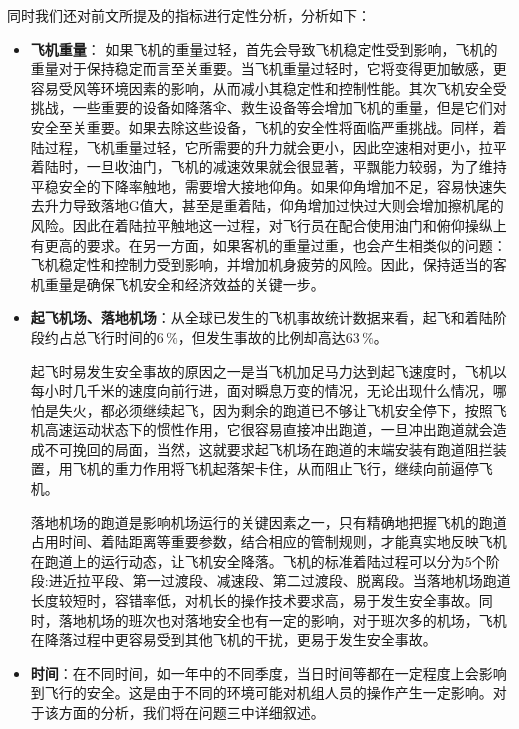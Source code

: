 \documentclass{MathorCupModeling}
\begin{document}
	同时我们还对前文所提及的指标进行定性分析，分析如下：
	\begin{itemize}\label{影响}
		\item \textbf{飞机重量}： 如果飞机的重量过轻，首先会导致飞机稳定性受到影响，飞机的重量对于保持稳定而言至关重要。当飞机重量过轻时，它将变得更加敏感，更容易受风等环境因素的影响，从而减小其稳定性和控制性能。其次飞机安全受挑战，一些重要的设备如降落伞、救生设备等会增加飞机的重量，但是它们对安全至关重要。如果去除这些设备，飞机的安全性将面临严重挑战。同样，着陆过程，飞机重量过轻，它所需要的升力就会更小，因此空速相对更小，拉平着陆时，一旦收油门，飞机的减速效果就会很显著，平飘能力较弱，为了维持平稳安全的下降率触地，需要增大接地仰角。如果仰角增加不足，容易快速失去升力导致落地G值大，甚至是重着陆，仰角增加过快过大则会增加擦机尾的风险。因此在着陆拉平触地这一过程，对飞行员在配合使用油门和俯仰操纵上有更高的要求。在另一方面，如果客机的重量过重，也会产生相类似的问题：飞机稳定性和控制力受到影响，并增加机身疲劳的风险。因此，保持适当的客机重量是确保飞机安全和经济效益的关键一步。
		\item \textbf{起飞机场、落地机场}：从全球已发生的飞机事故统计数据来看，起飞和着陆阶段约占总飞行时间的$6\,\%$，但发生事故的比例却高达$63\,\%$。
		
		起飞时易发生安全事故的原因之一是当飞机加足马力达到起飞速度时，飞机以每小时几千米的速度向前行进，面对瞬息万变的情况，无论出现什么情况，哪怕是失火，都必须继续起飞，因为剩余的跑道已不够让飞机安全停下，按照飞机高速运动状态下的惯性作用，它很容易直接冲出跑道，一旦冲出跑道就会造成不可挽回的局面，当然，这就要求起飞机场在跑道的末端安装有跑道阻拦装置，用飞机的重力作用将飞机起落架卡住，从而阻止飞行，继续向前逼停飞机。

		落地机场的跑道是影响机场运行的关键因素之一，只有精确地把握飞机的跑道占用时间、着陆距离等重要参数，结合相应的管制规则，才能真实地反映飞机在跑道上的运行动态，让飞机安全降落。飞机的标准着陆过程可以分为5个阶段:进近拉平段、第一过渡段、减速段、第二过渡段、脱离段。当落地机场跑道长度较短时，容错率低，对机长的操作技术要求高，易于发生安全事故。同时，落地机场的班次也对落地安全也有一定的影响，对于班次多的机场，飞机在降落过程中更容易受到其他飞机的干扰，更易于发生安全事故。
		\item \textbf{时间}：在不同时间，如一年中的不同季度，当日时间等都在一定程度上会影响到飞行的安全。这是由于不同的环境可能对机组人员的操作产生一定影响。对于该方面的分析，我们将在问题三中详细叙述。
	\end{itemize}
\end{document}
